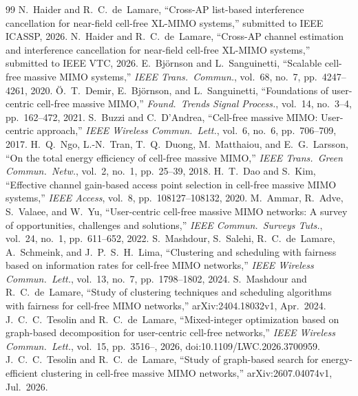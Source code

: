 \documentclass[11pt]{article}
\begin{document}
\begin{thebibliography}{99}\small
{} N.~Haider and R.~C.~de~Lamare, ``Cross-AP list-based interference cancellation for near-field cell-free XL-MIMO systems,'' submitted to IEEE ICASSP, 2026.
 N.~Haider and R.~C.~de~Lamare, ``Cross-AP channel estimation and interference cancellation for near-field cell-free XL-MIMO systems,'' submitted to IEEE VTC, 2026.
 E.~Bj\"ornson and L.~Sanguinetti, ``Scalable cell-free massive MIMO systems,'' \emph{IEEE Trans.\ Commun.}, vol.~68, no.~7, pp.~4247--4261, 2020.
 \"O.~T.~Demir, E.~Bj\"ornson, and L.~Sanguinetti, ``Foundations of user-centric cell-free massive MIMO,'' \emph{Found.\ Trends Signal Process.}, vol.~14, no.~3--4, pp.~162--472, 2021.
 S.~Buzzi and C.~D'Andrea, ``Cell-free massive MIMO: User-centric approach,'' \emph{IEEE Wireless Commun.\ Lett.}, vol.~6, no.~6, pp.~706--709, 2017.
 H.~Q.~Ngo, L.-N.~Tran, T.~Q.~Duong, M.~Matthaiou, and E.~G.~Larsson, ``On the total energy efficiency of cell-free massive MIMO,'' \emph{IEEE Trans.\ Green Commun.\ Netw.}, vol.~2, no.~1, pp.~25--39, 2018.
 H.~T.~Dao and S.~Kim, ``Effective channel gain-based access point selection in cell-free massive MIMO systems,'' \emph{IEEE Access}, vol.~8, pp.~108127--108132, 2020.
 M.~Ammar, R.~Adve, S.~Valaee, and W.~Yu, ``User-centric cell-free massive MIMO networks: A survey of opportunities, challenges and solutions,'' \emph{IEEE Commun.\ Surveys Tuts.}, vol.~24, no.~1, pp.~611--652, 2022.
 S.~Mashdour, S.~Salehi, R.~C.~de~Lamare, A.~Schmeink, and J.~P.~S.~H.~Lima, ``Clustering and scheduling with fairness based on information rates for cell-free MIMO networks,'' \emph{IEEE Wireless Commun.\ Lett.}, vol.~13, no.~7, pp.~1798--1802, 2024.
 S.~Mashdour and R.~C.~de~Lamare, ``Study of clustering techniques and scheduling algorithms with fairness for cell-free MIMO networks,'' arXiv:2404.18032v1, Apr.\ 2024.
 J.~C.~C.~Tesolin and R.~C.~de~Lamare, ``Mixed-integer optimization based on graph-based decomposition for user-centric cell-free networks,'' \emph{IEEE Wireless Commun.\ Lett.}, vol.~15, pp.~3516--, 2026, doi:10.1109/LWC.2026.3700959.
 J.~C.~C.~Tesolin and R.~C.~de~Lamare, ``Study of graph-based search for energy-efficient clustering in cell-free massive MIMO networks,'' arXiv:2607.04074v1, Jul.\ 2026.

\end{thebibliography}
\end{document}
